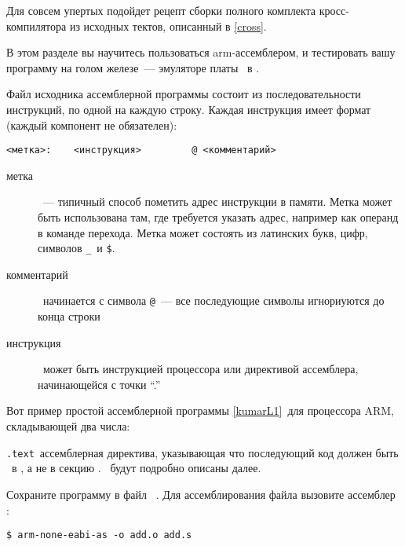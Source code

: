 Для совсем упертых подойдет рецепт сборки полного комплекта кросс-компилятора из
исходных тектов, описанный в \ref{cross}.

\secup
{}\secdown

В этом разделе вы научитесь пользоваться arm-ассемблером, и тестировать вашу
программу на голом железе\ --- эмуляторе платы \ в \qemu.

Файл исходника ассемблерной программы состоит из последовательности инструкций,
по одной на каждую строку. Каждая инструкция имеет формат (каждый
компонент не обязателен):

\begin{verbatim}
<метка>:    <инструкция>         @ <комментарий>
\end{verbatim}

\begin{description}
\item[метка]\ --- типичный способ пометить адрес инструкции в памяти. Метка
может быть использована там, где требуется указать адрес, например как операнд
в команде перехода. Метка может состоять из латинских букв, цифр, символов \verb|_|\ и \verb|$|.
\item[комментарий]\ начинается с символа \verb|@|\ --- все последующие символы
игнориуются до конца строки
\item[инструкция]\ может быть инструкцией процессора или директивой ассемблера,
начинающейся с точки ``.''
\end{description}

Вот пример простой ассемблерной программы \ref{kumarL1}\ для процессора ARM,
складывающей два числа:

\label{kumarL1}

\verb|.text|\ ассемблерная директива, указывающая что последующий код должен
быть \ в , а не в секцию
. \ будут подробно описаны далее.


Сохраните программу в файл \ .
Для ассемблирования файла вызовите ассемблер :

\begin{verbatim}
$ arm-none-eabi-as -o add.o add.s
\end{verbatim}

